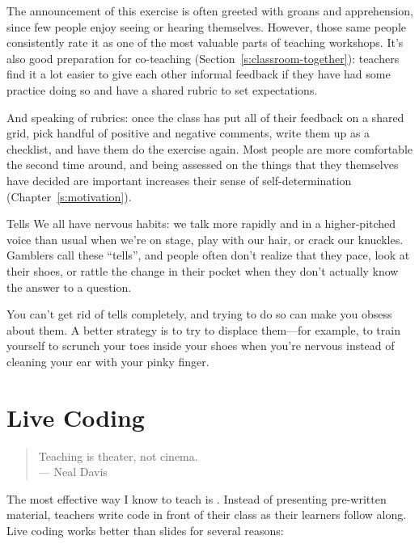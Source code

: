 The announcement of this exercise is often greeted with groans and apprehension,
since few people enjoy seeing or hearing themselves.
However,
those same people consistently rate it as one of the most valuable parts of teaching workshops.
It's also good preparation for co-teaching (Section~\ref{s:classroom-together}):
teachers find it a lot easier to give each other informal feedback
if they have had some practice doing so
and have a shared rubric to set expectations.

And speaking of rubrics:
once the class has put all of their feedback on a shared grid,
pick handful of positive and negative comments,
write them up as a checklist,
and have them do the exercise again.
Most people are more comfortable the second time around,
and being assessed on the things that they themselves have decided are important
increases their sense of self-determination (Chapter~\ref{s:motivation}).

\begin{aside}{Tells}
  We all have nervous habits:
  we talk more rapidly and in a higher-pitched voice than usual when we're on stage,
  play with our hair,
  or crack our knuckles.
  Gamblers call these ``tells'',
  and people often don't realize that they pace,
  look at their shoes,
  or rattle the change in their pocket
  when they don't actually know the answer to a question.

  You can't get rid of tells completely,
  and trying to do so can make you obsess about them.
  A better strategy is to try to displace them---for example,
  to train yourself to scrunch your toes inside your shoes when you're nervous
  instead of cleaning your ear with your pinky finger.
\end{aside}

\section{Live Coding}\label{s:performance-live}

\begin{quote}

  Teaching is theater, not cinema. \\
  --- Neal Davis

\end{quote}

The most effective way I know to teach is .
Instead of presenting pre-written material,
teachers write code in front of their class as their learners follow along.
Live coding works better than slides for several reasons:

